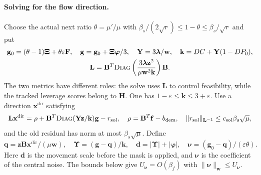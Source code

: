 \documentclass[11pt]{article}
\theoremstyle{remark}
\newcommand{\BB}{\mathbf B}
\newcommand{\HH}{\mathbf H}
\newcommand{\LL}{\mathbf L}
\newcommand{\ff}{\mathbf f}
\newcommand{\llambda}{\boldsymbol{\lambda}}
\newcommand{\ww}{\mathbf w}
\newcommand{\zz}{\mathbf z}
\newcommand{\xxdir}{\mathbf{x}^{\mathrm{dir}}}
\newcommand{\XXi}{\boldsymbol{\Xi}}
\newcommand{\UUps}{\boldsymbol{\Upsilon}}
\newcommand{\YY}{\mathbf Y}
\newcommand{\FF}{\mathbf F}
\renewcommand{\gg}{\mathbf g}
\newcommand{\qq}{\mathbf q}
\newcommand{\kk}{\mathbf k}
\newcommand{\dd}{\mathbf d}
\newcommand{\nnu}{\boldsymbol{\nu}}
\newcommand{\pphi}{\boldsymbol{\varphi}}
\newcommand{\diag}{\textsc{Diag}}
\newcommand{\norm}[1]{\lVert#1\rVert}
\begin{document}
\paragraph{Solving for the flow direction.}
Choose the actual next ratio $\theta=\mu'/\mu$ with $\beta_s/(2\sqrt
r)\le1-\theta\le\beta_s/\sqrt r$ and put
\[
\begin{gathered}
 \gg_0=(\theta-1)\XXi+\theta\varepsilon \FF,\quad
 \gg=\gg_0+\XXi\pphi/3,\quad \YY=3\llambda/\ww,\quad
 \kk=DC+\YY(1-DP_0),\\
 \LL=\BB^T\diag
       \left(\frac{3\llambda \zz^2}{\mu \ww^2 \kk}\right)\BB.
\end{gathered}
\]
The two metrics have different roles: the solve uses $\LL$ to control
feasibility, while the tracked leverage scores belong to $\HH$.
One has $1-\varepsilon\le \kk\le3+\varepsilon$.
Use a direction $\xxdir$ satisfying
\begin{equation}
 \LL \xxdir=\rho+\BB^T\diag(\YY\zz/\kk)\gg-r_{\rm sol},
 \quad \rho=\BB^T\ff-b_{\rm dem},\quad
 \norm{r_{\rm sol}}_{\LL^{-1}}
                        \le c_{\rm sol}\beta_s\sqrt\mu,
 \label{eq:ram-solve}
\end{equation}
and the old residual has norm at most $\beta_s\sqrt\mu$.
Define
\[
 \qq=\zz\BB \xxdir/(\mu \ww),\quad \UUps=(\gg-\qq)/\kk,\quad
 \dd=|\UUps|+|\pphi|,\quad
 \nnu=(\gg_0-\qq)/(\varepsilon\theta).
\]
Here $\dd$ is the movement scale before the mask is applied, and $\nnu$ is the
coefficient of the central noise.
The bounds below give $U_{\nnu}=O(\beta_f)$ with $\norm{\nnu}_{\ww}\le U_{\nnu}$.
\end{document}
